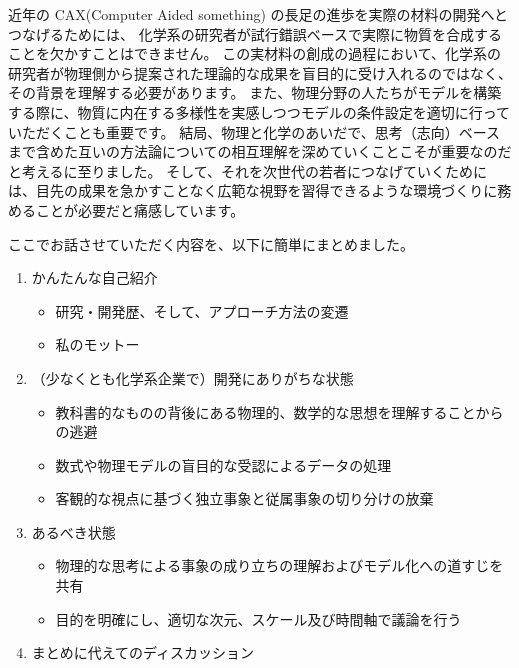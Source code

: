 \documentclass[uplatex,a4paper, 11pt]{jsarticle}
\begin{document}
近年の CAX(Computer Aided something) の長足の進歩を実際の材料の開発へとつなげるためには、
化学系の研究者が試行錯誤ベースで実際に物質を合成することを欠かすことはできません。
この実材料の創成の過程において、化学系の研究者が物理側から提案された理論的な成果を盲目的に受け入れるのではなく、
その背景を理解する必要があります。
また、物理分野の人たちがモデルを構築する際に、物質に内在する多様性を実感しつつモデルの条件設定を適切に行っていただくことも重要です。
結局、物理と化学のあいだで、思考（志向）ベースまで含めた互いの方法論についての相互理解を深めていくことこそが重要なのだと考えるに至りました。
そして、それを次世代の若者につなげていくためには、目先の成果を急かすことなく広範な視野を習得できるような環境づくりに務めることが必要だと痛感しています。
\vspace{3mm}
\begin{boxnote}
    \vspace{-1mm}
    ここでお話させていただく内容を、以下に簡単にまとめました。
    \vspace{-1mm}
\begin{enumerate}
    \item かんたんな自己紹介
    \begin{itemize}
        \item 研究・開発歴、そして、アプローチ方法の変遷
        \item 私のモットー
    \end{itemize}
    \item （少なくとも化学系企業で）開発にありがちな状態
    \begin{itemize}
        \item 教科書的なものの背後にある物理的、数学的な思想を理解することからの逃避
        \item 数式や物理モデルの盲目的な受認によるデータの処理
        \item 客観的な視点に基づく独立事象と従属事象の切り分けの放棄
    \end{itemize}
    \item あるべき状態
    \begin{itemize}
        \item 物理的な思考による事象の成り立ちの理解およびモデル化への道すじを共有
        \item 目的を明確にし、適切な次元、スケール及び時間軸で議論を行う
    \end{itemize}
    \item まとめに代えてのディスカッション
\end{enumerate}
\end{boxnote}
\end{document}
